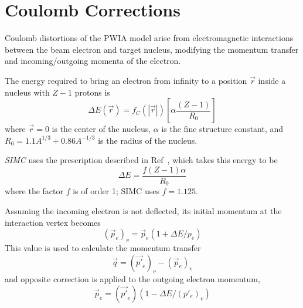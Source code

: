 \section{Coulomb Corrections}
Coulomb distortions of the PWIA model arise from electromagnetic interactions
between the beam electron and target nucleus, modifying the momentum transfer
and incoming/outgoing momenta of the electron.


The energy required to bring an electron from infinity to a position $\vec{r}$
inside a nucleus with $Z-1$ protons is
\begin{equation}
    \Delta E(\vec{r})=f_{C}(|\vec{r}|)\left[\alpha \frac{(Z-1)}{R_{0}}\right]
\end{equation}
where
$\vec{r}=0$ is the center of the nucleus,
$\alpha$ is the fine structure constant,
and
$R_0=1.1 A^{1/3}+0.86 A^{-1/3}$ is the radius of the nucleus.


\textit{SIMC} uses the prescription described in Ref~\cite{Aste_2005}, which
takes this energy to be
\begin{equation}
    \Delta E = \frac{f(Z-1)\alpha}{R_0}
\end{equation}
where the factor $f$ is of order 1; SIMC uses $f=1.125$.


Assuming the incoming electron is not deflected, its initial momentum at the
interaction vertex becomes
\begin{equation}
    (\vec{p}_e)_v = \vec{p}_e(1 + \Delta E / p_e)
\end{equation}
This value is used to calculate the momentum transfer
\begin{equation}
    \vec{q} = (\vec{p'}_e)_v - (\vec{p}_e)_v
\end{equation}
and opposite correction is applied to the outgoing electron momentum,
\begin{equation}
    \vec{p}_e = (\vec{p'}_e)(1 - \Delta E / (p'_e)_v)
\end{equation}




